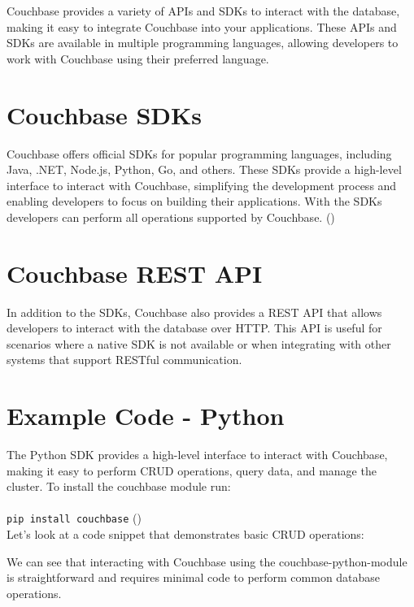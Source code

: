 Couchbase provides a variety of APIs and SDKs to interact with the database, making it easy to integrate Couchbase into your applications. These APIs and SDKs are available in multiple programming languages, allowing developers to work with Couchbase using their preferred language.

\section{Couchbase SDKs}
Couchbase offers official SDKs for popular programming languages, including Java, .NET, Node.js, Python, Go, and others. These SDKs provide a high-level interface to interact with Couchbase, simplifying the development process and enabling developers to focus on building their applications. With the SDKs developers can perform all operations supported by Couchbase.
(\cite{couchbaseSDKs})


\section{Couchbase REST API}
In addition to the SDKs, Couchbase also provides a REST API that allows developers to interact with the database over HTTP. This API is useful for scenarios where a native SDK is not available or when integrating with other systems that support RESTful communication.


\section{Example Code - Python}
The Python SDK provides a high-level interface to interact with Couchbase, making it easy to perform CRUD operations, query data, and manage the cluster. To install the couchbase module run:
\\
\\
\lstinline|pip install couchbase|
(\cite{couchbasePythonModule})
\\

Let's look at a code snippet that demonstrates basic CRUD operations:


We can see that interacting with Couchbase using the couchbase-python-module is straightforward and requires minimal code to perform common database operations.